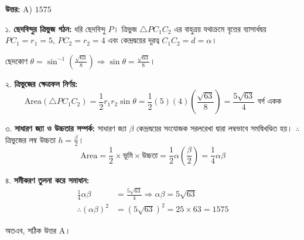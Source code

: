 \documentclass[12pt, a4paper]{article}
\begin{document}
\vspace{0.5em}
\begin{tcolorbox}[answerbox]
    \textbf{\color{success} উত্তর:} A) $1575$
\end{tcolorbox}
\vspace{1em}

\begin{tcolorbox}[solutionbox={সমাধান (Solution)}]
    \noindent
    ১. \textbf{ছেদবিন্দুর ত্রিভুজ গঠন:} 
    ধরি ছেদবিন্দু $P$। ত্রিভুজ $\triangle PC_1C_2$ এর বাহুত্রয় যথাক্রমে বৃত্তের ব্যাসার্ধদ্বয় $PC_1 = r_1 = 5$, $PC_2 = r_2 = 4$ এবং কেন্দ্রদ্বয়ের দূরত্ব $C_1C_2 = d = \alpha$। 
    
    \vspace{0.5em}
    ছেদকোণ $\theta = \sin^{-1}\left(\frac{\sqrt{63}}{8}\right) \Rightarrow \sin\theta = \frac{\sqrt{63}}{8}$।
    
    \vspace{0.5em}
    ২. \textbf{ত্রিভুজের ক্ষেত্রফল নির্ণয়:}
    \[ \text{Area}(\triangle PC_1C_2) = \frac{1}{2} r_1 r_2 \sin\theta = \frac{1}{2}(5)(4)\left(\frac{\sqrt{63}}{8}\right) = \frac{5\sqrt{63}}{4} \text{ বর্গ একক} \]
    
    \vspace{0.5em}
    ৩. \textbf{সাধারণ জ্যা ও উচ্চতার সম্পর্ক:} 
    সাধারণ জ্যা $\beta$ কেন্দ্রদ্বয়ের সংযোজক সরলরেখা দ্বারা লম্বভাবে সমদ্বিখণ্ডিত হয়। $\therefore$ ত্রিভুজের লম্ব উচ্চতা $h = \frac{\beta}{2}$।
    \[ \text{Area} = \frac{1}{2} \times \text{ভূমি} \times \text{উচ্চতা} = \frac{1}{2} \alpha \left(\frac{\beta}{2}\right) = \frac{1}{4} \alpha \beta \]
    
    \vspace{0.5em}
    ৪. \textbf{সমীকরণ তুলনা করে সমাধান:}
    \begin{align*}
        \frac{1}{4}\alpha\beta &= \frac{5\sqrt{63}}{4} \Rightarrow \alpha\beta = 5\sqrt{63} \\
        \therefore (\alpha\beta)^2 &= (5\sqrt{63})^2 = 25 \times 63 = 1575
    \end{align*}
    
    \vspace{0.5em}
    অতএব, সঠিক উত্তর A।
\end{tcolorbox}
\end{document}
